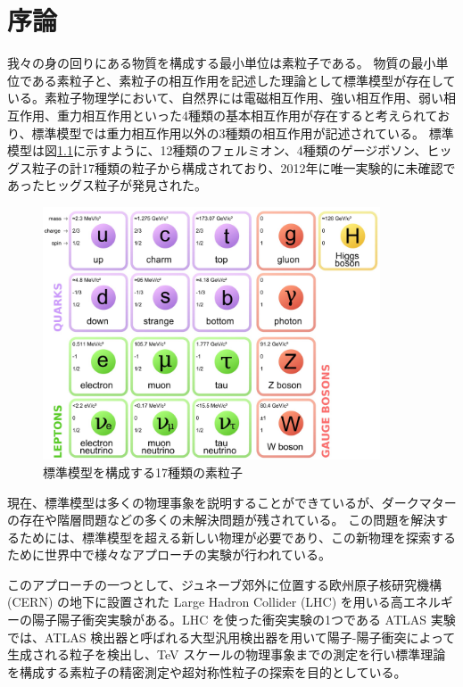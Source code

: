 \chapter{序論}
我々の身の回りにある物質を構成する最小単位は素粒子である。
物質の最小単位である素粒子と、素粒子の相互作用を記述した理論として標準模型が存在している。素粒子物理学において、自然界には電磁相互作用、強い相互作用、弱い相互作用、重力相互作用といった4種類の基本相互作用が存在すると考えられており、標準模型では重力相互作用以外の3種類の相互作用が記述されている。
標準模型は図\ref{fig:標準模型}に示すように、12種類のフェルミオン、4種類のゲージボソン、ヒッグス粒子の計17種類の粒子から構成されており、2012年に唯一実験的に未確認であったヒッグス粒子が発見された。
\begin{figure}[tb]
  \centering
  \includegraphics[clip, width=10cm]{fig/1/standardmodel.jpg}
  \caption{標準模型を構成する17種類の素粒子}
  \label{fig:標準模型}
\end{figure}

現在、標準模型は多くの物理事象を説明することができているが、ダークマターの存在や階層問題などの多くの未解決問題が残されている。
この問題を解決するためには、標準模型を超える新しい物理が必要であり、この新物理を探索するために世界中で様々なアプローチの実験が行われている。

このアプローチの一つとして、ジュネーブ郊外に位置する欧州原子核研究機構 (CERN) の地下に設置された Large Hadron Collider (LHC) を用いる高エネルギーの陽子陽子衝突実験がある。LHC を使った衝突実験の1つである ATLAS 実験では、ATLAS 検出器と呼ばれる大型汎用検出器を用いて陽子-陽子衝突によって生成される粒子を検出し、TeV スケールの物理事象までの測定を行い標準理論を構成する素粒子の精密測定や超対称性粒子の探索を目的としている。

